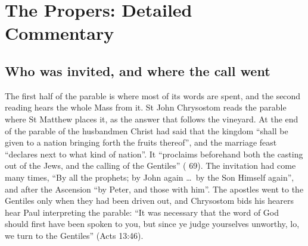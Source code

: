 
\section{The Propers: Detailed Commentary}

\subsection{Who was invited, and where the call went}

The first half of the parable is where most of its words are spent, and the
second reading hears the whole Mass from it. St John Chrysostom reads the
parable where St Matthew places it, as the answer that follows the vineyard. At
the end of the parable of the husbandmen Christ had said that the kingdom
``shall be given to a nation bringing forth the fruits thereof'', and the
marriage feast ``declares next to what kind of nation''. It ``proclaims
beforehand both the casting out of the Jews, and the calling of the Gentiles''
( 69). The invitation had come many times, ``By all
the prophets; by John again \dots\ by the Son Himself again'', and after the
Ascension ``by Peter, and those with him''. The apostles went to the Gentiles
only when they had been driven out, and Chrysostom bids his hearers hear Paul
interpreting the parable: ``It was necessary that the word of God should first have
been spoken to you, but since ye judge yourselves unworthy, lo, we turn to the
Gentiles'' (Acts 13:46).

